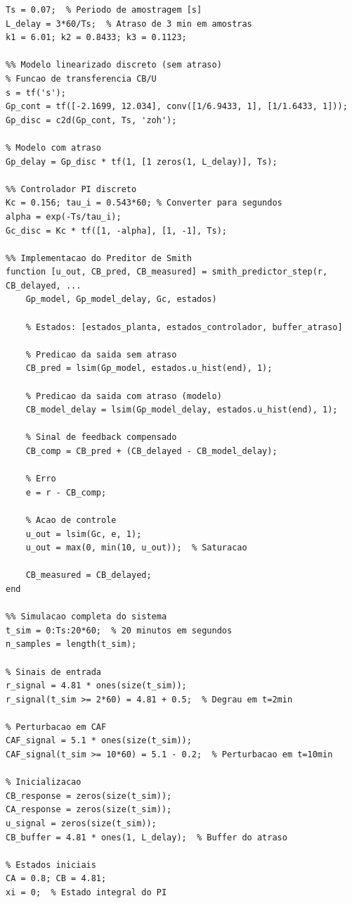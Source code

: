 \documentclass[a4paper,12pt]{article}
\begin{document}
\begin{lstlisting}[caption=Implementacao do Preditor de Smith Discreto]
%% Parametros do sistema
Ts = 0.07;  % Periodo de amostragem [s]
L_delay = 3*60/Ts;  % Atraso de 3 min em amostras
k1 = 6.01; k2 = 0.8433; k3 = 0.1123;

%% Modelo linearizado discreto (sem atraso)
% Funcao de transferencia CB/U
s = tf('s');
Gp_cont = tf([-2.1699, 12.034], conv([1/6.9433, 1], [1/1.6433, 1]));
Gp_disc = c2d(Gp_cont, Ts, 'zoh');

% Modelo com atraso
Gp_delay = Gp_disc * tf(1, [1 zeros(1, L_delay)], Ts);

%% Controlador PI discreto
Kc = 0.156; tau_i = 0.543*60; % Converter para segundos
alpha = exp(-Ts/tau_i);
Gc_disc = Kc * tf([1, -alpha], [1, -1], Ts);

%% Implementacao do Preditor de Smith
function [u_out, CB_pred, CB_measured] = smith_predictor_step(r, CB_delayed, ...
    Gp_model, Gp_model_delay, Gc, estados)
    
    % Estados: [estados_planta, estados_controlador, buffer_atraso]
    
    % Predicao da saida sem atraso
    CB_pred = lsim(Gp_model, estados.u_hist(end), 1);
    
    % Predicao da saida com atraso (modelo)
    CB_model_delay = lsim(Gp_model_delay, estados.u_hist(end), 1);
    
    % Sinal de feedback compensado
    CB_comp = CB_pred + (CB_delayed - CB_model_delay);
    
    % Erro
    e = r - CB_comp;
    
    % Acao de controle
    u_out = lsim(Gc, e, 1);
    u_out = max(0, min(10, u_out));  % Saturacao
    
    CB_measured = CB_delayed;
end

%% Simulacao completa do sistema
t_sim = 0:Ts:20*60;  % 20 minutos em segundos
n_samples = length(t_sim);

% Sinais de entrada
r_signal = 4.81 * ones(size(t_sim));
r_signal(t_sim >= 2*60) = 4.81 + 0.5;  % Degrau em t=2min

% Perturbacao em CAF
CAF_signal = 5.1 * ones(size(t_sim));
CAF_signal(t_sim >= 10*60) = 5.1 - 0.2;  % Perturbacao em t=10min

% Inicializacao
CB_response = zeros(size(t_sim));
CA_response = zeros(size(t_sim));
u_signal = zeros(size(t_sim));
CB_buffer = 4.81 * ones(1, L_delay);  % Buffer do atraso

% Estados iniciais
CA = 0.8; CB = 4.81;
xi = 0;  % Estado integral do PI


\end{lstlisting}
\end{document}
